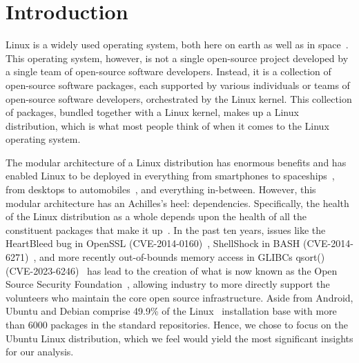 \documentclass[sn-mathphys-num]{sn-jnl}%
\theoremstyle{thmstyleone}%
\theoremstyle{thmstyletwo}%
\theoremstyle{thmstylethree}%
\begin{document}


\maketitle

\section{Introduction}
Linux is a widely used operating system, both here on earth as well as in space~\cite{vaughan-nichols_earth_2020}. This operating system, however, is not a single open-source project developed by a single team of open-source software developers. Instead, it is a collection of open-source software packages, each supported by various individuals or teams of open-source software developers, orchestrated by the Linux kernel. This collection of packages, bundled together with a Linux kernel, makes up a Linux distribution, which is what most people think of when it comes to the Linux operating system. 

The modular architecture of a Linux distribution has enormous benefits and has enabled Linux to be deployed in everything from smartphones to spaceships~\cite{vaughan-nichols_linux_2023,vaughan-nichols_earth_2020}, from desktops to automobiles~\cite{vaughan-nichols_its_2019}, and everything in-between.  However, this modular architecture has an Achilles's heel: dependencies. Specifically, the health of the Linux distribution as a whole depends upon the health of all the constituent packages that make it up~\cite{linaker_how_2022}. In the past ten years, issues like the HeartBleed bug in OpenSSL (CVE-2014-0160)~\cite{noauthor_cve-2014-0160_2014}, ShellShock in BASH (CVE-2014-6271)~\cite{noauthor_cve-2014-6271_2014}, and more recently out-of-bounds memory access in GLIBCs qsort() (CVE-2023-6246)~\cite{noauthor_cve-2023-6246_2024} has lead to the creation of what is now known as the Open Source Security Foundation~\cite{noauthor_open_nodate}, allowing industry to more directly support the volunteers who maintain the core open source infrastructure. Aside from Android, Ubuntu and Debian comprise 49.9\% of the Linux~\cite{noauthor_linux_nodate} installation base with more than 6000 packages in the standard repositories. Hence, we chose to focus on the Ubuntu Linux distribution, which we feel would yield the most significant insights for our analysis.
\end{document}
